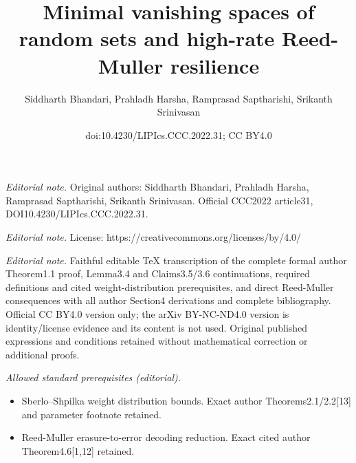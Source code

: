 \documentclass[10pt,a4paper]{article}
\title{Minimal vanishing spaces of random sets and high-rate Reed-Muller resilience}
\author{Siddharth Bhandari, Prahladh Harsha, Ramprasad Saptharishi, Srikanth Srinivasan}
\date{doi:10.4230/LIPIcs.CCC.2022.31; CC BY4.0}
\begin{document}
\maketitle
\noindent\textit{Editorial note.} Original authors: Siddharth Bhandari, Prahladh Harsha, Ramprasad Saptharishi, Srikanth Srinivasan. Official CCC2022 article31, DOI10.4230/LIPIcs.CCC.2022.31.\par\medskip
\noindent\textit{Editorial note.} License: https://creativecommons.org/licenses/by/4.0/\par\medskip
\noindent\textit{Editorial note.} Faithful editable TeX transcription of the complete formal author Theorem1.1 proof, Lemma3.4 and Claims3.5/3.6 continuations, required definitions and cited weight-distribution prerequisites, and direct Reed-Muller consequences with all author Section4 derivations and complete bibliography. Official CC BY4.0 version only; the arXiv BY-NC-ND4.0 version is identity/license evidence and its content is not used. Original published expressions and conditions retained without mathematical correction or additional proofs.\par\medskip
\noindent\textit{Allowed standard prerequisites (editorial).}\begin{itemize}
\item Sberlo--Shpilka weight distribution bounds. Exact author Theorems2.1/2.2[13] and parameter footnote retained.
\item Reed-Muller erasure-to-error decoding reduction. Exact cited author Theorem4.6[1,12] retained.
\end{itemize}\medskip
\end{document}

